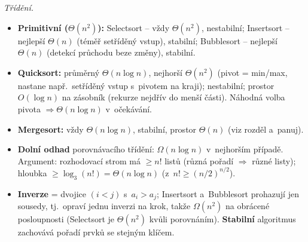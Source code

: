\documentclass[11pt,a4paper]{article}
\begin{document}
\begin{poznamka}
\smallskip
\emph{Třídění.}
\begin{itemize}
  \item \textbf{Primitivní ($\Theta(n^2)$):} Selectsort -- vždy $\Theta(n^2)$, nestabilní; Insertsort -- nejlepší $\Theta(n)$ (téměř setříděný vstup), stabilní; Bubblesort -- nejlepší $\Theta(n)$ (detekcí průchodu beze změny), stabilní.
  \item \textbf{Quicksort:} průměrný $\Theta(n\log n)$, nejhorší $\Theta(n^2)$ (pivot = min/max, nastane např.\ setříděný vstup s~pivotem na kraji); nestabilní; prostor $O(\log n)$ na zásobník (rekurze nejdřív do menší části). Náhodná volba pivota $\Rightarrow\Theta(n\log n)$ v~očekávání.
  \item \textbf{Mergesort:} vždy $\Theta(n\log n)$, stabilní, prostor $\Theta(n)$ (viz rozděl a~panuj).
  \item \textbf{Dolní odhad} porovnávacího třídění: $\Omega(n\log n)$ v~nejhorším případě. Argument: rozhodovací strom má $\ge n!$ listů (různá pořadí $\Rightarrow$ různé listy); hloubka $\ge\log_3(n!)=\Theta(n\log n)$ (z~$n!\ge(n/2)^{n/2}$).
  \item \textbf{Inverze} = dvojice $(i<j)$ s~$a_i>a_j$; Insertsort a~Bubblesort prohazují jen sousedy, tj.\ opraví jednu inverzi na krok, takže $\Omega(n^2)$ na obrácené posloupnosti (Selectsort je $\Theta(n^2)$ kvůli porovnáním). \textbf{Stabilní} algoritmus zachovává pořadí prvků se stejným klíčem.
\end{itemize}


\end{poznamka}
\end{document}
